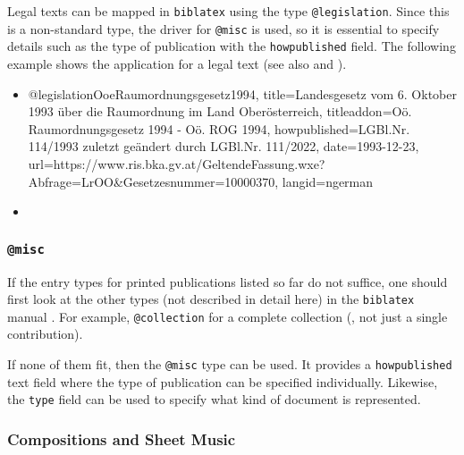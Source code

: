 Legal texts can be mapped in \texttt{biblatex} using the type
\texttt{@legislation}. Since this is a non-standard type, the driver for
\texttt{@misc} is used, so it is essential to specify details such as the type
of publication with the \texttt{howpublished} field. The following example shows
the application for a legal text (see also \cite{FhStG1993} and
\cite{EuRichtlinie2000}).
%
\begin{itemize}
\item[]
\begin{GenericCode}[numbers=none]
@legislation{OoeRaumordnungsgesetz1994,
  title={Landesgesetz vom 6. Oktober 1993 über die Raumordnung im Land Oberösterreich},
  titleaddon={Oö. Raumordnungsgesetz 1994 - Oö. ROG 1994},
  howpublished={LGBl.Nr. 114/1993 zuletzt geändert durch LGBl.Nr. 111/2022},
  date={1993-12-23},
  url={https://www.ris.bka.gv.at/GeltendeFassung.wxe?Abfrage=LrOO&Gesetzesnummer=10000370},
  langid={ngerman}
}
\end{GenericCode}
\item[\cite{OoeRaumordnungsgesetz1994}] 
\end{itemize}
%


\subsubsection{\texttt{\bfseries @misc}}
\label{sec:@misc}

If the entry types for printed publications listed so far do not suffice, one
should first look at the other types (not described in detail here) in the
\texttt{biblatex} manual \cite{Kime2022}. For example, \texttt{@collection} for
a complete collection (\ie, not just a single contribution).

If none of them fit, then the \texttt{@misc} type can be used. It provides a
\texttt{howpublished} text field where the type of publication can be specified
individually. Likewise, the \texttt{type} field can be used to specify what kind
of document is represented.


\subsubsection{Compositions and Sheet Music}
\label{sec:sheet-music}

